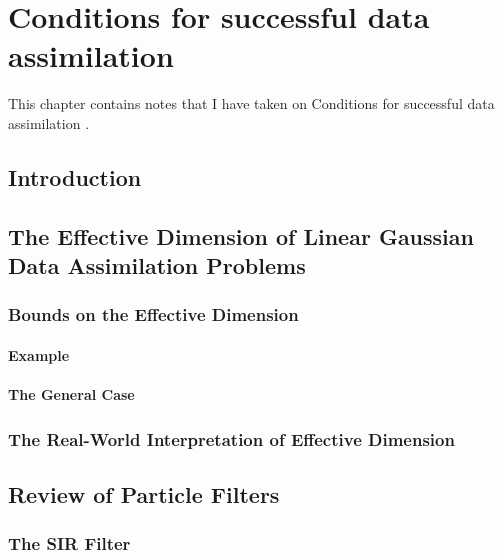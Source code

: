 \chapter{Conditions for successful data assimilation}
\label{ch:chorin_morzfeld}

This chapter contains notes that I have taken on Conditions for successful data assimilation \citep{chorin2013conditions}.

\section{Introduction}
\label{chorin:intro}

\section{The Effective Dimension of Linear Gaussian Data Assimilation Problems}
\label{chorin:eff_dim}

\subsection{Bounds on the Effective Dimension}
\label{chorin:eff_dim:bounds}

\subsubsection{Example}
\label{chorin:eff_dim:bounds:example}

\subsubsection{The General Case}
\label{chorin:eff_dim:bounds:general}

\subsection{The Real-World Interpretation of Effective Dimension}
\label{chorin:eff_dim:real_world}

\section{Review of Particle Filters}
\label{chorin:particle}

\subsection{The SIR Filter}
\label{chorin:particle:sir}

